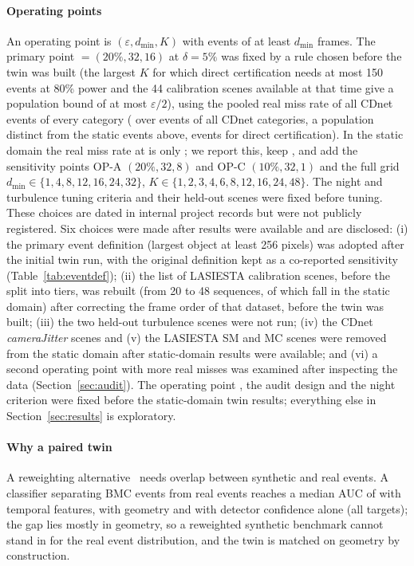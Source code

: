 \paragraph{Operating points} An operating point is $(\varepsilon,d_{\min},K)$ with events of at least $d_{\min}$
frames. The primary point \OPs{} $=(20\%, 32, 16)$ at $\delta=5\%$ was fixed by a rule chosen before the twin was built
(the largest $K$ for which direct certification needs at most 150 events at 80\% power and the 44 calibration scenes
available at that time give a population bound of at most $\varepsilon/2$), using the pooled real miss rate of all
CDnet events of every category (\nOldPhat{} over \nOldN{} events of all CDnet categories, a population distinct from
the static events above, \nOldNreq{} events for direct certification). In the static domain the real miss rate at \OPs{} is only
\nPmainOP; we report this, keep \OPs, and add the sensitivity points OP-A $(20\%,32,8)$ and OP-C $(10\%,32,1)$ and the
full grid $d_{\min}\in\{1,4,8,12,16,24,32\}$, $K\in\{1,2,3,4,6,8,12,16,24,48\}$. The night and turbulence tuning criteria and their held-out
scenes were fixed before tuning. These choices are dated in internal project records but were not publicly registered.
Six choices were made after results were available and are disclosed: (i) the primary event definition (largest
object at least 256 pixels) was adopted after the initial twin run, with the original definition kept as a co-reported
sensitivity (Table~\ref{tab:eventdef}); (ii) the list of LASIESTA calibration scenes, before the split into tiers, was rebuilt (from 20 to 48 sequences, of which \nMainLASIESTA{} fall in the static domain) after correcting
the frame order of that dataset, before the twin was built; (iii) the two held-out turbulence scenes were not run;
(iv) the CDnet \emph{cameraJitter} scenes and (v) the LASIESTA SM and MC scenes were removed from the static domain
after static-domain results were available; and (vi) a second operating point with more real misses was examined after
inspecting the data (Section~\ref{sec:audit}). The operating point \OPs, the audit design and the night criterion were
fixed before the static-domain twin results; everything else in Section~\ref{sec:results} is exploratory.

\paragraph{Why a paired twin} A reweighting alternative~\cite{shimodaira2000} needs overlap between synthetic and real
events. A classifier separating BMC events from real events reaches a median AUC of \nIWtemporal{} with temporal
features, \nIWgeometry{} with geometry and \nIWappearance{} with detector confidence alone (all targets); the gap lies
mostly in geometry, so a reweighted synthetic benchmark cannot stand in for the real event distribution, and the twin
is matched on geometry by construction.


